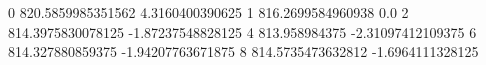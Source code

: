 0 820.5859985351562 4.3160400390625
1 816.2699584960938 0.0
2 814.3975830078125 -1.87237548828125
4 813.958984375 -2.31097412109375
6 814.327880859375 -1.94207763671875
8 814.5735473632812 -1.6964111328125
